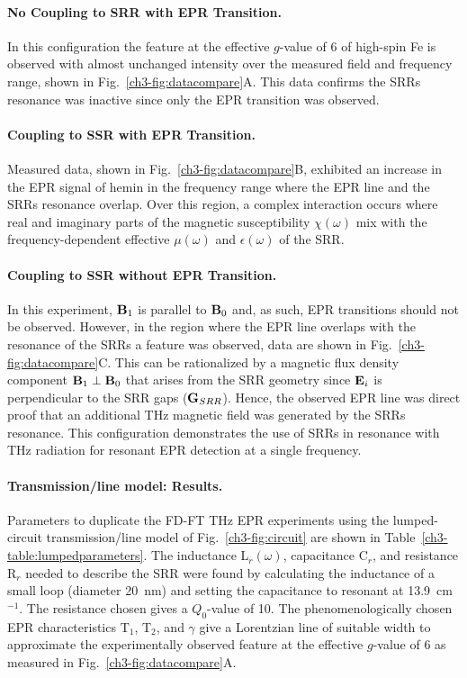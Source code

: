 \noindent \paragraph*{No Coupling to SRR with EPR Transition.} In this configuration the feature at the effective $g$-value of 6 of high-spin Fe is observed with almost unchanged intensity over the measured field and frequency range, shown in Fig.~\ref{ch3-fig:datacompare}A. This data confirms the SRRs resonance was inactive since only the EPR transition was observed. 

\noindent \paragraph*{Coupling to SSR with EPR Transition.} Measured data, shown in Fig.~\ref{ch3-fig:datacompare}B, exhibited an increase in the EPR signal of hemin in the frequency range where the EPR line and the SRRs resonance overlap. Over this region, a complex interaction occurs where real and imaginary parts of the magnetic susceptibility $\chi(\omega)$ mix with the frequency-dependent effective $\mu(\omega)$ and $\epsilon(\omega)$ of the SRR.

\noindent \paragraph*{Coupling to SSR without EPR Transition.} In this experiment, $\textbf{B}_{1}$ is parallel to $\textbf{B}_{0}$ and, as such, EPR transitions should not be observed. However, in the region where the EPR line overlaps with the resonance of the SRRs a feature was observed, data are shown in Fig.~\ref{ch3-fig:datacompare}C. This can be rationalized by a magnetic flux density component $\textbf{B}_{1}\perp\textbf{B}_{0}$ that arises from the SRR geometry since $\textbf{E}_{i}$ is perpendicular to the SRR gaps ($\textbf{G}_{SRR}$). Hence, the observed EPR line was direct proof that an additional THz magnetic field was generated by the SRRs resonance. This configuration demonstrates the use of SRRs in resonance with THz radiation for resonant EPR detection at a single frequency. 

\noindent \paragraph*{Transmission\-/line model: Results.} Parameters to duplicate the FD-FT THz EPR experiments using the lumped-circuit transmission\-/line model of Fig.~\ref{ch3-fig:circuit} are shown in Table~\ref{ch3-table:lumpedparameters}. The inductance L$_r(\omega)$, capacitance C$_r$, and resistance R$_r$ needed to describe the SRR were found by calculating the inductance of a small loop (diameter 20~nm) and setting the capacitance to resonant at 13.9~cm$^{-1}$. The resistance chosen gives a $Q_0$-value of 10. The phenomenologically chosen EPR characteristics T$_1$, T$_2$, and $\gamma$ give a Lorentzian line of suitable width to approximate the experimentally observed feature at the effective $g$-value of 6 as measured in Fig.~\ref{ch3-fig:datacompare}A. 

